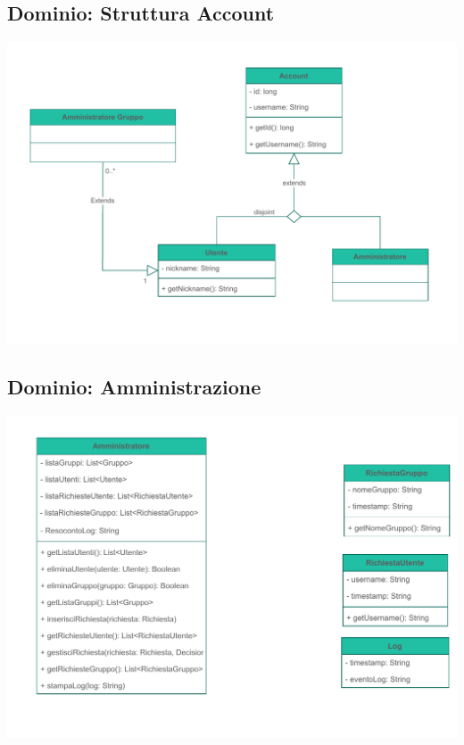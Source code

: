 \subsection*{Dominio: Struttura Account}
{}
\vspace{0.5cm}
\begin{adjustwidth}{-2cm}{0cm}
\includegraphics[scale=0.9]{progettazione/Progettazione-Struttura Account.drawio.pdf}
\end{adjustwidth}
\vspace{1cm}

\subsection*{Dominio: Amministrazione}
{}
\vspace{0.5cm}
\begin{adjustwidth}{-2cm}{0cm}
\includegraphics[scale=1]{progettazione/Progettazione-Amministrazione.drawio.pdf}
\end{adjustwidth}
\vspace{1cm}

